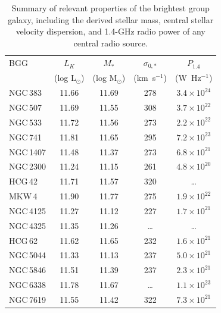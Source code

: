 \documentclass[useAMS,usenatbib]{mn2e}
\begin{document}
\begin{table} 
 \centering
   \caption{Summary of relevant properties of the brightest group
   galaxy, including the derived stellar mass, central stellar
   velocity dispersion, and 1.4-GHz radio power of any central radio
   source.}
  \label{tab,BGG} 
  \begin{tabular}{@{}lcccc@{}} \hline 
   \multicolumn{1}{l}{BGG} & 
\multicolumn{1}{c}{$L_K$} & 
\multicolumn{1}{c}{$M_\ast$} & 
\multicolumn{1}{c}{$\sigma_{0,\ast}$} &
\multicolumn{1}{c}{$P_{1.4}$} \\
  &  (log L$_\odot$) &  (log M$_\odot$) & (km~s$^{-1}$) &  (W~Hz$^{-1}$)
  \\ \hline 
NGC\,383  & 11.66 & 11.69 & 278    & $3.4\times 10^{24}$\\    
NGC\,507  & 11.69 & 11.55 & 308    & $3.7\times 10^{22}$\\
NGC\,533  & 11.72 & 11.56 & 273    & $2.2\times 10^{22}$\\
NGC\,741  & 11.81 & 11.65 & 295    & $7.2\times 10^{23}$\\
NGC\,1407 & 11.48 & 11.37 & 273    & $6.8\times 10^{21}$\\
NGC\,2300 & 11.24 & 11.15 & 261    & $4.8\times 10^{20}$\\
HCG\,42   & 11.71 & 11.57 & 320    & \ldots \\
MKW\,4    & 11.90 & 11.77 & 275    & $1.9\times 10^{22}$\\
NGC\,4125 & 11.27 & 11.12 & 227    & $1.7\times 10^{21}$\\
NGC\,4325 & 11.35 & 11.26 & \ldots & \ldots \\
HCG\,62   & 11.62 & 11.65 & 232    & $1.6\times 10^{21}$\\
NGC\,5044 & 11.33 & 11.13 & 237    & $5.0\times 10^{21}$\\
NGC\,5846 & 11.51 & 11.39 & 237    & $2.3\times 10^{21}$\\
NGC\,6338 & 11.78 & 11.67 & \ldots & $1.1\times 10^{23}$\\
NGC\,7619 & 11.55 & 11.42 & 322    & $7.3\times 10^{21}$\\
\hline 
\end{tabular} 
\end{table} 
\end{document}
